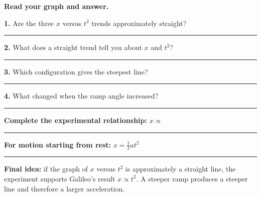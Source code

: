 \documentclass[10pt,a4paper,landscape]{article}
\newcommand{\blank}[1]{\rule{#1}{0.4pt}}
\begin{document}
\vspace{-1mm}
\textbf{Read your graph and answer.}

\begin{minipage}[t]{0.49\textwidth}
\textbf{1.} Are the three $x$ versus $t^2$ trends approximately straight? \blank{3.0cm}

\textbf{2.} What does a straight trend tell you about $x$ and $t^2$?\\[1mm]
\blank{11.5cm}
\end{minipage}
\hfill
\begin{minipage}[t]{0.49\textwidth}
\textbf{3.} Which configuration gives the steepest line? \blank{3.1cm}

\textbf{4.} What changed when the ramp angle increased?\\[1mm]
\blank{11.5cm}
\end{minipage}

\vspace{2mm}
\textbf{Complete the experimental relationship:}\qquad
$x\propto$ \blank{1.8cm}
\qquad\qquad
\textbf{For motion starting from rest:}\qquad
$\displaystyle x=\frac{1}{2}at^2$

\vspace{1.5mm}\hrule\vspace{1mm}
{\small\textbf{Final idea:} if the graph of $x$ versus $t^2$ is approximately a straight line, the experiment supports Galileo's result $x\propto t^2$. A steeper ramp produces a steeper line and therefore a larger acceleration.}
\end{document}
